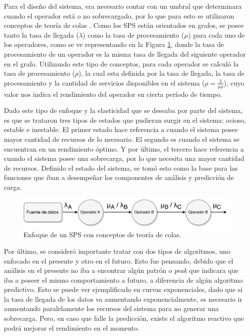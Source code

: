 Para el diseño del sistema, era necesario contar con un umbral que determinara cuando el operador está o no sobrecargado, por lo que para esto se utilizaron conceptos de teoría de colas \citep{bose2013introduction}. Como los SPS están orientados en grafos, se posee tanto la tasa de llegada ($\lambda$) como la tasa de procesamiento ($\mu$) para cada uno de los operadores, como se ve representando en la Figura \ref{fig:analisisTeoriaColas}, donde la tasa de procesamiento de un operador es la misma tasa de llegada del siguiente operador en el grafo. Utilizando este tipo de conceptos, para cada operador se calculó la tasa de procesamiento ($\rho$), la cual esta definida por la tasa de llegada, la tasa de procesamiento y la cantidad de servicios disponibles en el sistema ($\rho = \frac{\lambda}{\mu \rho}$), cuyo valor nos indica el rendimiento del operador en cierta período de tiempo.

Dado este tipo de enfoque y la elasticidad que se deseaba por parte del sistema, es que se trataron tres tipos de estados que pudieran surgir en el sistema: ocioso, estable e inestable. El primer estado hace referencia a cuando el sistema posee mayor cantidad de recursos de lo necesario. El segundo es cuando el sistema se encuentran en un rendimiento óptimo. Y por último, el tercero hace referencia a cuando el sistema posee una sobrecarga, por lo que necesita una mayor cantidad de recursos. Definido el estado del sistema, se tomó esto como la base para las funciones que iban a desempeñar los componentes de análisis y predicción de carga.

\begin{figure}[!hb]
	\centering
		\includegraphics[scale=0.6]{images/AnalisisTeoriaColas.pdf}
	\caption{Enfoque de un SPS con conceptos de teoría de colas.}
	\label{fig:analisisTeoriaColas}
\end{figure}

Por último, se consideró importante tratar con dos tipos de algoritmos, uno enfocado en el presente y otro en el futuro. Esto fue pensando, debido que el análisis en el presente no iba a encontrar algún patrón o \textit{peak} que indicara que iba a poseer el mismo comportamiento a futuro, a diferencia de algún algoritmo predictivo. Esto se puede ver ejemplificado en curvas exponenciales, dado que si la tasa de llegada de los datos va aumentando exponencialmente, es necesario ir aumentando paralelamente los recursos del sistema para no generar una sobrecarga. Pero, en caso que falle la predicción, existe el algoritmo reactivo que podrá mejorar el rendimiento en el momento.

